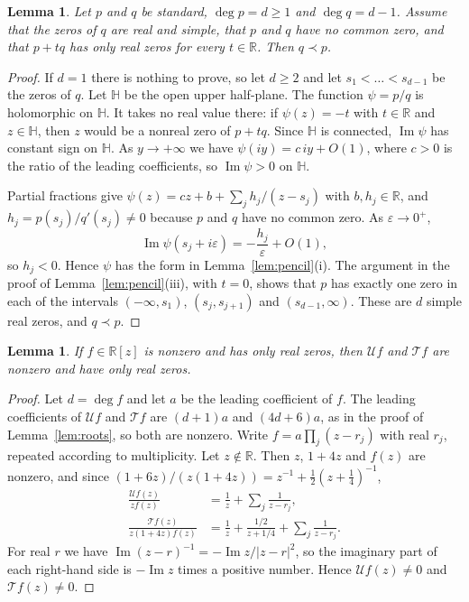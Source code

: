 \documentclass{amsart}
\newtheorem{lemma}[theorem]{Lemma}
\theoremstyle{remark}
\numberwithin{equation}{section}
\newcommand{\RR}{\mathbb{R}}
\newcommand{\HH}{\mathbb{H}}
\renewcommand{\Im}{\operatorname{Im}}
\newcommand{\cU}{\mathcal{U}}
\newcommand{\cT}{\mathcal{T}}
\begin{document}
\begin{lemma}\label{lem:converse}
Let $p$ and $q$ be standard, $\deg p=d\ge 1$ and $\deg q=d-1$. Assume that
the zeros of $q$ are real and simple, that $p$ and $q$ have no common zero,
and that $p+tq$ has only real zeros for every $t\in\RR$. Then $q\prec p$.
\end{lemma}

\begin{proof}
If $d=1$ there is nothing to prove, so let $d\ge 2$ and let
$s_1<\dots<s_{d-1}$ be the zeros of $q$. Let $\HH$ be the open upper
half-plane. The function $\psi=p/q$ is holomorphic on $\HH$. It takes no real
value there: if $\psi(z)=-t$ with $t\in\RR$ and $z\in\HH$, then $z$ would be a
nonreal zero of $p+tq$. Since $\HH$ is connected, $\Im\psi$ has constant sign
on $\HH$. As $y\to+\infty$ we have $\psi(iy)=c\,iy+O(1)$, where $c>0$ is the
ratio of the leading coefficients, so $\Im\psi>0$ on $\HH$.

Partial fractions give $\psi(z)=cz+b+\sum_j h_j/(z-s_j)$ with $b,h_j\in\RR$,
and $h_j=p(s_j)/q'(s_j)\ne 0$ because $p$ and $q$ have no common zero. As
$\varepsilon\to 0^+$,
\[
\Im\psi(s_j+i\varepsilon)=-\frac{h_j}{\varepsilon}+O(1),
\]
so $h_j<0$. Hence $\psi$ has the form in Lemma~\ref{lem:pencil}(i). The
argument in the proof of Lemma~\ref{lem:pencil}(iii), with $t=0$, shows that $p$ has exactly one zero in
each of the intervals $(-\infty,s_1)$, $(s_j,s_{j+1})$ and
$(s_{d-1},\infty)$. These are $d$ simple real zeros, and $q\prec p$.
\end{proof}

\begin{lemma}\label{lem:preserve}
If $f\in\RR[z]$ is nonzero and has only real zeros, then $\cU f$ and $\cT f$
are nonzero and have only real zeros.
\end{lemma}

\begin{proof}
Let $d=\deg f$ and let $a$ be the leading coefficient of $f$. The leading
coefficients of $\cU f$ and $\cT f$ are $(d+1)a$ and $(4d+6)a$, as in the
proof of Lemma~\ref{lem:roots}, so both are nonzero. Write
$f=a\prod_j(z-r_j)$ with real $r_j$, repeated according to multiplicity.
Let $z\notin\RR$. Then $z$, $1+4z$ and $f(z)$ are nonzero, and
since $(1+6z)/(z(1+4z))=z^{-1}+\frac12(z+\frac14)^{-1}$,
\begin{align*}
\frac{\cU f(z)}{zf(z)}&=\frac1z+\sum_j\frac{1}{z-r_j},\\
\frac{\cT f(z)}{z(1+4z)f(z)}&=\frac1z+\frac{1/2}{z+1/4}+\sum_j\frac{1}{z-r_j}.
\end{align*}
For real $r$ we have $\Im (z-r)^{-1}=-\Im z/|z-r|^2$, so the imaginary part
of each right-hand side is $-\Im z$ times a positive number. Hence
$\cU f(z)\ne 0$ and $\cT f(z)\ne 0$.
\end{proof}
\end{document}
